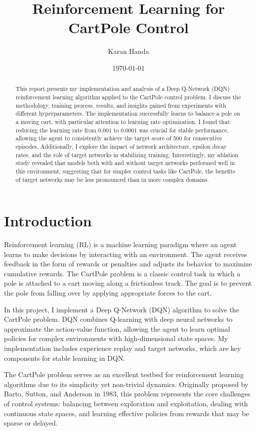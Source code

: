 \documentclass{article}
\title{Reinforcement Learning for CartPole Control}
\author{Karan Handa}
\date{\today}
\begin{document}
\maketitle

\begin{abstract}
This report presents my implementation and analysis of a Deep Q-Network (DQN) reinforcement learning algorithm applied to the CartPole control problem. I discuss the methodology, training process, results, and insights gained from experiments with different hyperparameters. The implementation successfully learns to balance a pole on a moving cart, with particular attention to learning rate optimization. I found that reducing the learning rate from 0.001 to 0.0001 was crucial for stable performance, allowing the agent to consistently achieve the target score of 500 for consecutive episodes. Additionally, I explore the impact of network architecture, epsilon decay rates, and the role of target networks in stabilizing training. Interestingly, my ablation study revealed that models both with and without target networks performed well in this environment, suggesting that for simpler control tasks like CartPole, the benefits of target networks may be less pronounced than in more complex domains.
\end{abstract}

\section{Introduction}
Reinforcement learning (RL) is a machine learning paradigm where an agent learns to make decisions by interacting with an environment. The agent receives feedback in the form of rewards or penalties and adjusts its behavior to maximize cumulative rewards. The CartPole problem is a classic control task in which a pole is attached to a cart moving along a frictionless track. The goal is to prevent the pole from falling over by applying appropriate forces to the cart.

In this project, I implement a Deep Q-Network (DQN) algorithm to solve the CartPole problem. DQN combines Q-learning with deep neural networks to approximate the action-value function, allowing the agent to learn optimal policies for complex environments with high-dimensional state spaces. My implementation includes experience replay and target networks, which are key components for stable learning in DQN.

The CartPole problem serves as an excellent testbed for reinforcement learning algorithms due to its simplicity yet non-trivial dynamics. Originally proposed by Barto, Sutton, and Anderson in 1983, this problem represents the core challenges of control systems: balancing between exploration and exploitation, dealing with continuous state spaces, and learning effective policies from rewards that may be sparse or delayed.
\end{document}
